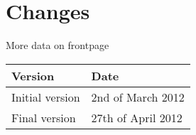\chapter{Changes}
\begin{list}{*}{}
	\item More data on frontpage
	
\end{list}

\begin{tabular}{| l | l |}
	\hline
	\rowcolor[gray]{0.8}
	\textbf{Version} & \textbf{Date} \\
	\hline
		Initial version &		2nd of March 2012 \\
		Final version &			27th of April 2012 \\
    \hline
\end{tabular}